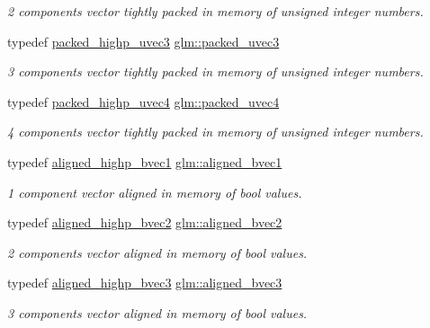 \begin{DoxyCompactItemize}
\begin{DoxyCompactList}\small\item\em 2 components vector tightly packed in memory of unsigned integer numbers. \end{DoxyCompactList}\item 
typedef \mbox{\hyperlink{group__gtc__type__aligned_ga607425d3ca2ad292b115d09aef19e372}{packed\+\_\+highp\+\_\+uvec3}} \mbox{\hyperlink{group__gtc__type__aligned_ga4433b8f226dc66e91e99cb8079ddc7e3}{glm\+::packed\+\_\+uvec3}}
\begin{DoxyCompactList}\small\item\em 3 components vector tightly packed in memory of unsigned integer numbers. \end{DoxyCompactList}\item 
typedef \mbox{\hyperlink{group__gtc__type__aligned_ga769bab317264c023f8ee77897e4b5894}{packed\+\_\+highp\+\_\+uvec4}} \mbox{\hyperlink{group__gtc__type__aligned_ga32a9f8facf5745a6513186ce61122310}{glm\+::packed\+\_\+uvec4}}
\begin{DoxyCompactList}\small\item\em 4 components vector tightly packed in memory of unsigned integer numbers. \end{DoxyCompactList}\item 
typedef \mbox{\hyperlink{group__gtc__type__aligned_ga92b3b4333bdc881b8ae27414162df481}{aligned\+\_\+highp\+\_\+bvec1}} \mbox{\hyperlink{group__gtc__type__aligned_ga7db5fd015b60682f3fdfe9cab47188dd}{glm\+::aligned\+\_\+bvec1}}
\begin{DoxyCompactList}\small\item\em 1 component vector aligned in memory of bool values. \end{DoxyCompactList}\item 
typedef \mbox{\hyperlink{group__gtc__type__aligned_gafa71bded1fc2dd68608207de49a96870}{aligned\+\_\+highp\+\_\+bvec2}} \mbox{\hyperlink{group__gtc__type__aligned_ga58579cb7fcfb892d0ae1f085327ae2ca}{glm\+::aligned\+\_\+bvec2}}
\begin{DoxyCompactList}\small\item\em 2 components vector aligned in memory of bool values. \end{DoxyCompactList}\item 
typedef \mbox{\hyperlink{group__gtc__type__aligned_ga224220a3fc5e5220141a568270cfb405}{aligned\+\_\+highp\+\_\+bvec3}} \mbox{\hyperlink{group__gtc__type__aligned_ga853a573b554adb2181d9ca23907f8a85}{glm\+::aligned\+\_\+bvec3}}
\begin{DoxyCompactList}\small\item\em 3 components vector aligned in memory of bool values. \end{DoxyCompactList}\item 

\end{DoxyCompactItemize}
